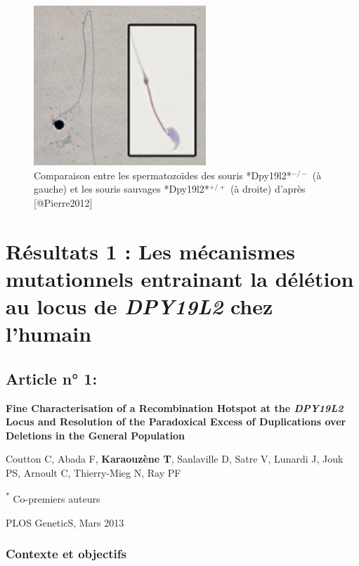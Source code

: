 \documentclass[12pt,twoside]{ugathesis}
\theoremstyle{definition}
\theoremstyle{definition}
\theoremstyle{remark}
\begin{document}
\begin{figure}

{\centering \includegraphics[scale=0.8]{figure/mouse_globo_spz} 

}

\caption[Comparaison entre les spermatozoïdes des souris *Dpy19l2*$^{-/-}$ (à gauche) et les souris sauvages *Dpy19l2*$^{+/+}$ (à droite)]{Comparaison entre les spermatozoïdes des souris *Dpy19l2*$^{-/-}$ (à gauche) et les souris sauvages *Dpy19l2*$^{+/+}$ (à droite) d'après [@Pierre2012]}\label{fig:mouseglobo}
\end{figure}

\newpage

\section{\texorpdfstring{Résultats 1 : Les mécanismes mutationnels
entrainant la délétion au locus de \emph{DPY19L2} chez
l'humain}{Résultats 1 : Les mécanismes mutationnels entrainant la délétion au locus de DPY19L2 chez l'humain}}\label{mecamut}

\subsection{Article n° 1:}\label{article-n-1}

\textbf{Fine Characterisation of a Recombination Hotspot at the
\emph{DPY19L2} Locus and Resolution of the Paradoxical Excess of
Duplications over Deletions in the General Population}

Coutton C, Abada F, \textbf{Karaouzène T}, Sanlaville D, Satre V,
Lunardi J, Jouk PS, Arnoult C, Thierry-Mieg N, Ray PF

\textsuperscript{*} Co-premiers auteurs

PLOS GeneticS, Mars 2013

\newpage

\subsubsection{Contexte et objectifs}\label{contexte-et-objectifs}
\end{document}
